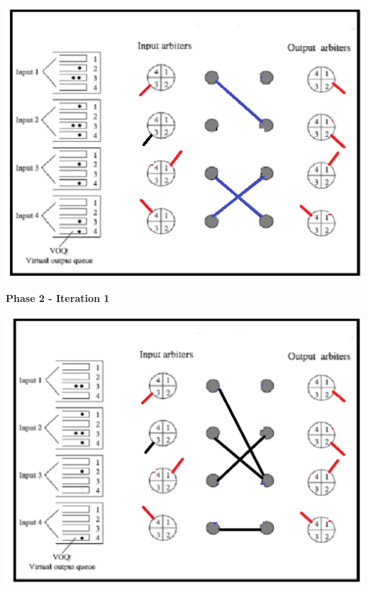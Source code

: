 \begin{qsolve}
	\begin{latin}
		
		\begin{center}
			\includegraphics*[width=0.7\linewidth]{pics/img19.png}
		\end{center}
		
		
		\textbf{Phase 2 - Iteration 1}\\
		\begin{center}
			\includegraphics*[width=0.7\linewidth]{pics/img20.png}
		\end{center}
		
	\end{latin}
\end{qsolve}
\newpage


